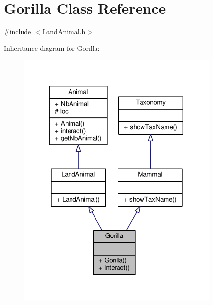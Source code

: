 \hypertarget{classGorilla}{}\section{Gorilla Class Reference}
\label{classGorilla}


{\ttfamily \#include $<$Land\+Animal.\+h$>$}



Inheritance diagram for Gorilla\+:
\nopagebreak
\begin{figure}[H]
\begin{center}
\leavevmode
\includegraphics[width=284pt]{classGorilla__inherit__graph}
\end{center}
\end{figure}


